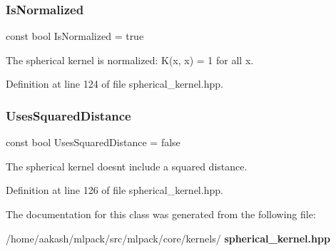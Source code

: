 \subsubsection{Is\+Normalized}
{\footnotesize\ttfamily const bool Is\+Normalized = true\hspace{0.3cm}{\ttfamily [static]}}



The spherical kernel is normalized\+: K(x, x) = 1 for all x. 



Definition at line 124 of file spherical\+\_\+kernel.\+hpp.

\mbox{\label{classmlpack_1_1kernel_1_1KernelTraits_3_01SphericalKernel_01_4_a12fc177e124e69c8efbac5b08e5c5196}} 
\subsubsection{Uses\+Squared\+Distance}
{\footnotesize\ttfamily const bool Uses\+Squared\+Distance = false\hspace{0.3cm}{\ttfamily [static]}}



The spherical kernel doesn\textquotesingle{}t include a squared distance. 



Definition at line 126 of file spherical\+\_\+kernel.\+hpp.



The documentation for this class was generated from the following file\+:\begin{DoxyCompactItemize}
\item 
/home/aakash/mlpack/src/mlpack/core/kernels/\textbf{ spherical\+\_\+kernel.\+hpp}\end{DoxyCompactItemize}
